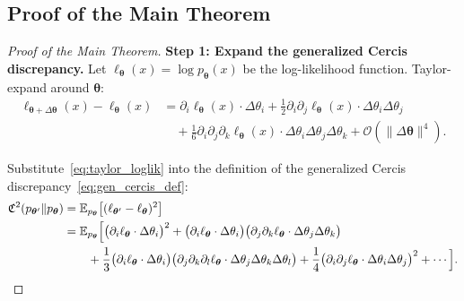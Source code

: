 \documentclass[12pt,a4paper]{article}
\theoremstyle{plain}
\theoremstyle{definition}
\theoremstyle{remark}
\newcommand{\E}{\mathbb{E}}
\newcommand{\CercisScore}{\mathfrak{C}}
\begin{document}
\subsection{Proof of the Main Theorem}

\begin{proof}[Proof of the Main Theorem]

\textbf{Step 1: Expand the generalized Cercis discrepancy.}
Let $\ell_{\bm{\theta}}(x) = \log p_{\bm{\theta}}(x)$ be the log-likelihood function. Taylor-expand around $\bm{\theta}$:
\begin{align}
    \ell_{\bm{\theta}+\Delta\bm{\theta}}(x) - \ell_{\bm{\theta}}(x)
    &= \partial_i \ell_{\bm{\theta}}(x) \cdot \Delta\theta_i
       + \frac{1}{2} \partial_i \partial_j \ell_{\bm{\theta}}(x) \cdot \Delta\theta_i \Delta\theta_j \nonumber\\
    &\quad + \frac{1}{6} \partial_i \partial_j \partial_k \ell_{\bm{\theta}}(x) \cdot \Delta\theta_i \Delta\theta_j \Delta\theta_k
       + \mathcal{O}(\|\Delta\bm{\theta}\|^4). \label{eq:taylor_loglik}
\end{align}

Substitute~\eqref{eq:taylor_loglik} into the definition of the generalized Cercis discrepancy~\eqref{eq:gen_cercis_def}:
\begin{align}
    \CercisScore^2(p_{\bm{\theta}'} \| p_{\bm{\theta}})
    &= \E_{p_{\bm{\theta}}}\bigl[(\ell_{\bm{\theta}'} - \ell_{\bm{\theta}})^2\bigr] \nonumber\\
    &= \E_{p_{\bm{\theta}}}\Bigl[
        \bigl(\partial_i \ell_{\bm{\theta}} \cdot \Delta\theta_i\bigr)^2
        + \bigl(\partial_i \ell_{\bm{\theta}} \cdot \Delta\theta_i\bigr)
          \bigl(\partial_j \partial_k \ell_{\bm{\theta}} \cdot \Delta\theta_j \Delta\theta_k\bigr) \nonumber\\
    &\qquad + \frac{1}{3} \bigl(\partial_i \ell_{\bm{\theta}} \cdot \Delta\theta_i\bigr)
                \bigl(\partial_j \partial_k \partial_l \ell_{\bm{\theta}} \cdot \Delta\theta_j \Delta\theta_k \Delta\theta_l\bigr)
        + \frac{1}{4} \bigl(\partial_i \partial_j \ell_{\bm{\theta}} \cdot \Delta\theta_i \Delta\theta_j\bigr)^2
        + \cdots \Bigr]. \label{eq:cercis_expanded}
\end{align}


\end{proof}
\end{document}
